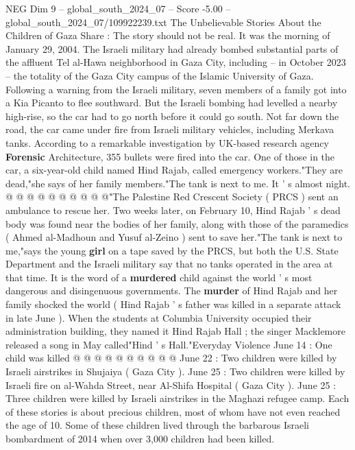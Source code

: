 \begin{textsample}{NEG Dim 9 – global\_south\_2024\_07 – Score -5.00 – global\_south\_2024\_07/109922239.txt}  \label{ex:f9_neg_333}
The Unbelievable Stories About the Children of Gaza Share : The story should not be real.
It was the morning of January 29, 2004.
The Israeli military had already bombed substantial parts of the affluent Tel al-Hawa neighborhood in Gaza City, including -- in October 2023 -- the totality of the Gaza City campus of the Islamic University of Gaza.
Following a warning from the Israeli military, seven members of a family got into a Kia Picanto to flee southward.
But the Israeli bombing had levelled a nearby high-rise, so the car had to go north before it could go south.
Not far down the road, the car came under fire from Israeli military vehicles, including Merkava tanks.
According to a remarkable investigation by UK-based research agency \textbf{Forensic} Architecture, 355 bullets were fired into the car.
One of those in the car, a six-year-old child named Hind Rajab, called emergency workers."They are dead,"she says of her family members."The tank is next to me.
It ' s almost night. @ @ @ @ @ @ @ @ @ @"The Palestine Red Crescent Society ( PRCS ) sent an ambulance to rescue her.
Two weeks later, on February 10, Hind Rajab ' s dead body was found near the bodies of her family, along with those of the paramedics ( Ahmed al-Madhoun and Yusuf al-Zeino ) sent to save her."The tank is next to me,"says the young \textbf{girl} on a tape saved by the PRCS, but both the U.S.
State Department and the Israeli military say that no tanks operated in the area at that time.
It is the word of a \textbf{murdered} child against the world ' s most dangerous and disingenuous governments.
The \textbf{murder} of Hind Rajab and her family shocked the world ( Hind Rajab ' s father was killed in a separate attack in late June ).
When the students at Columbia University occupied their administration building, they named it Hind Rajab Hall ; the singer Macklemore released a song in May called"Hind ' s Hall."Everyday Violence June 14 : One child was killed @ @ @ @ @ @ @ @ @ @ June 22 : Two children were killed by Israeli airstrikes in Shujaiya ( Gaza City ).
June 25 : Two children were killed by Israeli fire on al-Wahda Street, near Al-Shifa Hospital ( Gaza City ).
June 25 : Three children were killed by Israeli airstrikes in the Maghazi refugee camp.
Each of these stories is about precious children, most of whom have not even reached the age of 10.
Some of these children lived through the barbarous Israeli bombardment of 2014 when over 3,000 children had been killed.

\end{textsample}
